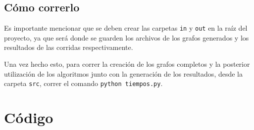 \documentclass[a4paper,10pt]{article}
\begin{document}
\subsection{Cómo correrlo}
	Es importante mencionar que se deben crear las carpetas \texttt{in} y \texttt{out} en la raíz del proyecto, ya que será donde se guarden los archivos de los grafos generados y los resultados de las corridas respectivamente.
	
	Una vez hecho esto, para correr la creación de los grafos completos y la posterior utilización de los algoritmos junto con la generación de los resultados, desde la carpeta \texttt{src}, correr el comando \texttt{python tiempos.py}.

\pagebreak

\newpage
\section{Código}
\lstset{
	language=Python, columns=flexible, breaklines=true, frame=single, title=bellman\_ford.py
}


\lstset{ title=creador\_grafos.py }


\lstset{ title=dijkstra.py }


\lstset{ title=floyd\_warshall.py }


\lstset{ title=grafo.py }


\lstset{ title=parser.py }


\lstset{ title=tiempos.py }

\end{document}
